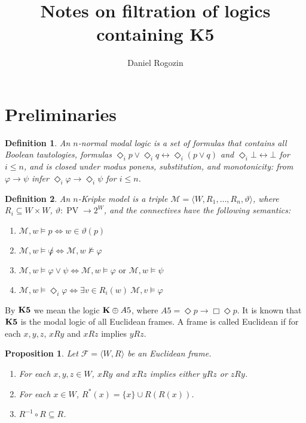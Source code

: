 \documentclass[a4paper]{article}
\author{Daniel Rogozin}
\date{}
\title{Notes on filtration of logics containing {\bf K5}}
\theoremstyle{defin}
\newtheorem{defin}{Definition}
\theoremstyle{theorem}
\theoremstyle{prop}
\newtheorem{prop}{Proposition}
\theoremstyle{lemma}
\theoremstyle{ex}
\theoremstyle{col}
\begin{document}
\maketitle

\nocite{*}

\section{Preliminaries}

\begin{defin}
  An $n$-normal modal logic is a set of formulas that contains all Boolean tautologies, formulas $\Diamond_i p \lor \Diamond_i q \leftrightarrow \Diamond_i (p \lor q)$ and $\Diamond_i \bot \leftrightarrow \bot$ for $i \leq n$, and is closed under modus ponens, substitution, and monotonicity: from $\varphi \rightarrow \psi$ infer $\Diamond_i \varphi \rightarrow \Diamond_i \psi$ for $i \leq n$.
\end{defin}

\begin{defin} An $n$-Kripke model is a triple $\mathcal{M} = \langle W, R_1, \dots, R_n, \vartheta \rangle$, where $R_i \subseteq W \times W$, $\vartheta : \operatorname{PV} \to 2^W$, and the connectives have the following semantics:

  \begin{enumerate}
    \item $\mathcal{M}, w \models p \Leftrightarrow w \in \vartheta(p)$
    \item $\mathcal{M}, w \models \not \varphi \Leftrightarrow \mathcal{M}, w \nvDash \varphi$
    \item $\mathcal{M}, w \models \varphi \lor \psi \Leftrightarrow \mathcal{M}, w \models \varphi \text{ or } \mathcal{M}, w \models \psi$
    \item $\mathcal{M}, w \models \Diamond_i \varphi \Leftrightarrow \exists v \in R_i(w) \: \mathcal{M}, v \models \varphi$
  \end{enumerate}
\end{defin}

By ${\bf K5}$ we mean the logic ${\bf K} \oplus {A5}$, where ${A5} = \Diamond p \to \Box \Diamond p$. It is known that ${\bf K5}$ is the modal logic of all Euclidean frames. A frame is called Euclidean if for each $x, y, z$, $x R y$ and $x R z$ implies $y R z$.

\begin{prop}
  Let $\mathcal{F} = \langle W, R \rangle$ be an Euclidean frame.

  \begin{enumerate}
    \item For each $x, y, z \in W$, $x R y$ and $x R z$ implies either $y R z$ or $z R y$.
    \item For each $x \in W$, $R^{*}(x) = \{ x\} \cup R(R(x))$.
    \item $R^{-1} \circ R \subseteq R$.
  \end{enumerate}
\end{prop}
\end{document}
